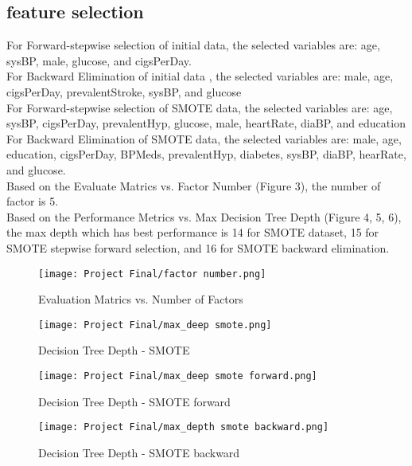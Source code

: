 \documentclass[11pt]{article}
\begin{document}
\subsection{feature selection}
\text
For Forward-stepwise selection of initial data, the selected variables are: age, sysBP, male, glucose, and cigsPerDay. \\
For Backward Elimination of initial data , the selected variables are: male, age, cigsPerDay, prevalentStroke, sysBP, and glucose\\
For Forward-stepwise selection of SMOTE data, the selected variables are: age, sysBP, cigsPerDay, prevalentHyp, glucose, male, heartRate, diaBP, and education\\
For Backward Elimination of SMOTE data, the selected variables are: male, age, education, cigsPerDay, BPMeds, prevalentHyp, diabetes, sysBP, diaBP, hearRate, and glucose. \\
Based on the Evaluate Matrics vs. Factor Number (Figure 3), the number of factor is 5.\\
Based on the Performance Metrics vs. Max Decision Tree Depth (Figure 4, 5, 6), the max depth which has best performance is 14 for SMOTE dataset, 15 for SMOTE stepwise forward selection, and 16 for SMOTE backward elimination. 

\begin{figure}[h]
    \centering
    \texttt{[image: Project Final/factor number.png]}
    \caption{Evaluation Matrics vs. Number of Factors}
    \label{fig:enter-label}
\end{figure}
\begin{figure}[h]
    \centering
    \texttt{[image: Project Final/max\_deep smote.png]}
    \caption{Decision Tree Depth - SMOTE}
    \label{fig:enter-label}
\end{figure}
\begin{figure}[h]
    \centering
    \texttt{[image: Project Final/max\_deep smote forward.png]}
    \caption{Decision Tree Depth - SMOTE forward}
    \label{fig:enter-label}
\end{figure}
\begin{figure}[h]
    \centering
    \texttt{[image: Project Final/max\_depth smote backward.png]}
    \caption{Decision Tree Depth - SMOTE backward}
    \label{fig:enter-label}
\end{figure}
\end{document}
